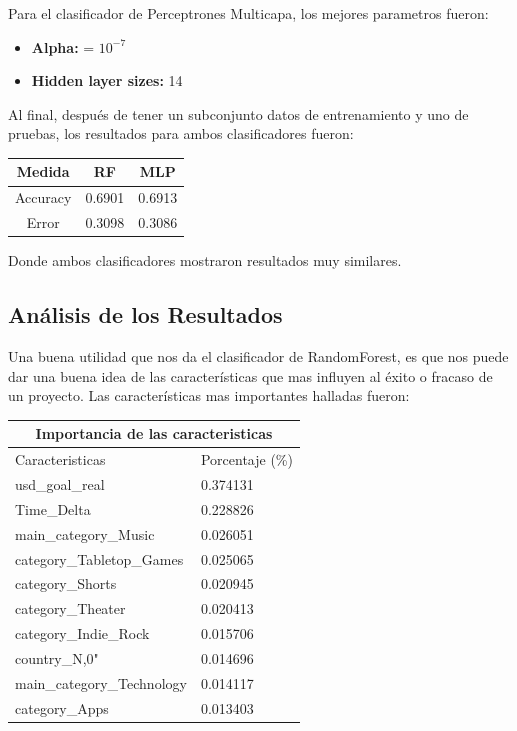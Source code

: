 \documentclass[journal]{IEEEtran}
\begin{document}
Para el clasificador de Perceptrones Multicapa, los mejores parametros fueron:
\begin{itemize}
	\item \textbf{Alpha:} = $10^{-7}$
	\item \textbf{Hidden layer sizes:} 14
\end{itemize}

Al final, después de tener un subconjunto datos de entrenamiento y uno de pruebas, los resultados para ambos clasificadores fueron:

\begin{center}
 \begin{tabular}{||c c c||} 
 \hline
 Medida & RF & MLP \\ [0.5ex] 
 \hline\hline
 Accuracy & 0.6901 & 0.6913 \\ 
 \hline
 Error & 0.3098 & 0.3086 \\[1ex] 
 \hline
\end{tabular}
\end{center}

Donde ambos clasificadores mostraron resultados muy similares.

\subsection{Análisis de los Resultados}
Una buena utilidad que nos da el clasificador de RandomForest, es que nos puede dar una buena idea de las características que mas influyen al éxito o fracaso de un proyecto. Las características mas importantes halladas fueron:\\


\begin{tabular}{ ||p{4cm}||p{3cm}|| }
 \hline
 \multicolumn{2}{|c|}{Importancia de las caracteristicas} \\
 \hline
 Caracteristicas & Porcentaje (\%) \\
 \hline
 usd\_goal\_real    & 0.374131 \\
 Time\_Delta       &  0.228826\\
 main\_category\_Music & 0.026051\\
 category\_Tabletop\_Games & 0.025065\\
 category\_Shorts &  0.020945\\
 category\_Theater &  0.020413\\
 category\_Indie\_Rock  & 0.015706\\
 country\_N,0" & 0.014696 \\
 main\_category\_Technology & 0.014117 \\
 category\_Apps & 0.013403 \\

 \hline
\end{tabular}\\
\end{document}
